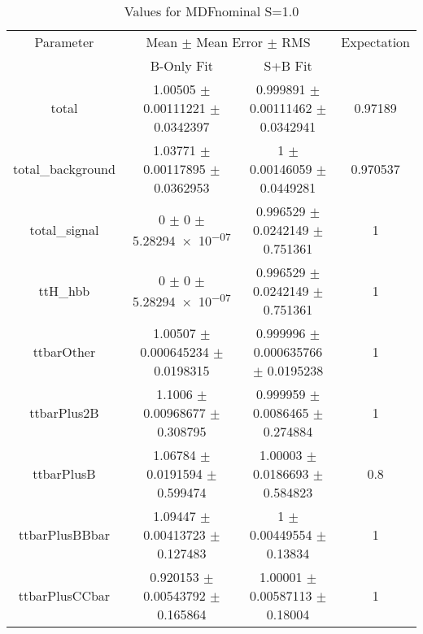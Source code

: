\begin{table}
\centering
\caption{Values for MDFnominal S=1.0}
\begin{tabular}{cccc}
\toprule
Parameter & \multicolumn{2}{c}{Mean $\pm$ Mean Error $\pm$ RMS} & Expectation\\
 & B-Only Fit & S+B Fit & \\
\midrule
total & \num{1.00505} $\pm$ \num{0.00111221} $\pm$ \num{0.0342397} & \num{0.999891} $\pm$ \num{0.00111462} $\pm$ \num{0.0342941} & \num{0.97189}\\
total\_background & \num{1.03771} $\pm$ \num{0.00117895} $\pm$ \num{0.0362953} & \num{1} $\pm$ \num{0.00146059} $\pm$ \num{0.0449281} & \num{0.970537}\\
total\_signal & \num{0} $\pm$ \num{0} $\pm$ \num{5.28294e-07} & \num{0.996529} $\pm$ \num{0.0242149} $\pm$ \num{0.751361} & \num{1}\\
ttH\_hbb & \num{0} $\pm$ \num{0} $\pm$ \num{5.28294e-07} & \num{0.996529} $\pm$ \num{0.0242149} $\pm$ \num{0.751361} & \num{1}\\
ttbarOther & \num{1.00507} $\pm$ \num{0.000645234} $\pm$ \num{0.0198315} & \num{0.999996} $\pm$ \num{0.000635766} $\pm$ \num{0.0195238} & \num{1}\\
ttbarPlus2B & \num{1.1006} $\pm$ \num{0.00968677} $\pm$ \num{0.308795} & \num{0.999959} $\pm$ \num{0.0086465} $\pm$ \num{0.274884} & \num{1}\\
ttbarPlusB & \num{1.06784} $\pm$ \num{0.0191594} $\pm$ \num{0.599474} & \num{1.00003} $\pm$ \num{0.0186693} $\pm$ \num{0.584823} & \num{0.8}\\
ttbarPlusBBbar & \num{1.09447} $\pm$ \num{0.00413723} $\pm$ \num{0.127483} & \num{1} $\pm$ \num{0.00449554} $\pm$ \num{0.13834} & \num{1}\\
ttbarPlusCCbar & \num{0.920153} $\pm$ \num{0.00543792} $\pm$ \num{0.165864} & \num{1.00001} $\pm$ \num{0.00587113} $\pm$ \num{0.18004} & \num{1}\\
\bottomrule
\end{tabular}
\end{table}